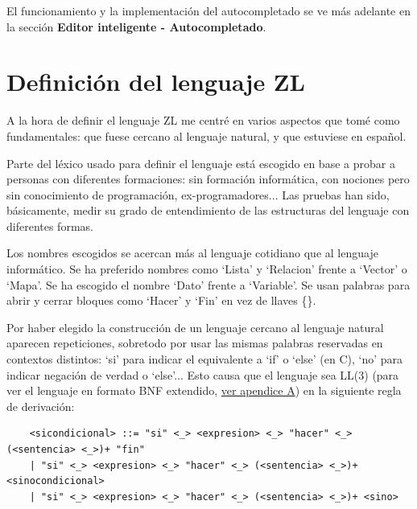 \documentclass{report}
\begin{document}
	El funcionamiento y la implementación del autocompletado se ve más adelante en la sección \textbf{Editor inteligente - Autocompletado}.
	
	\section{Definición del lenguaje ZL}
	
	A la hora de definir el lenguaje ZL me centré en varios aspectos que tomé como fundamentales: que fuese cercano al lenguaje natural, y que estuviese en español\cite{mundoingles}.
	
	\vspace{10px}
	
	Parte del léxico usado para definir el lenguaje está escogido en base a probar a personas con diferentes formaciones: sin formación informática, con nociones pero sin conocimiento de programación, ex-programadores... Las pruebas han sido, básicamente, medir su grado de entendimiento de las estructuras del lenguaje con diferentes formas. 
	
	\vspace{10px}
	
	Los nombres escogidos se acercan más al lenguaje cotidiano que al lenguaje informático. Se ha preferido nombres como `Lista' y `Relacion' frente a `Vector' o `Mapa'. Se ha escogido el nombre `Dato' frente a `Variable'. Se usan palabras para abrir y cerrar bloques como `Hacer' y `Fin' en vez de llaves \{\}. 
	
	\vspace{10px}
	
	Por haber elegido la construcción de un lenguaje cercano al lenguaje natural aparecen repeticiones, sobretodo por usar las mismas palabras reservadas en contextos distintos: `si' para indicar el equivalente a `if' o `else' (en C), `no' para indicar negación de verdad o `else'... Esto causa que el lenguaje sea LL(3) (para ver el lenguaje en formato BNF extendido, \hyperref[app:a]{ver apendice A}) en la siguiente regla de derivación:

	\vspace{10px}
	
	\begin{verbatim}
	<sicondicional> ::= "si" <_> <expresion> <_> "hacer" <_> (<sentencia> <_>)+ "fin"
	| "si" <_> <expresion> <_> "hacer" <_> (<sentencia> <_>)+ <sinocondicional>
	| "si" <_> <expresion> <_> "hacer" <_> (<sentencia> <_>)+ <sino>
	\end{verbatim}
	
\end{document}
